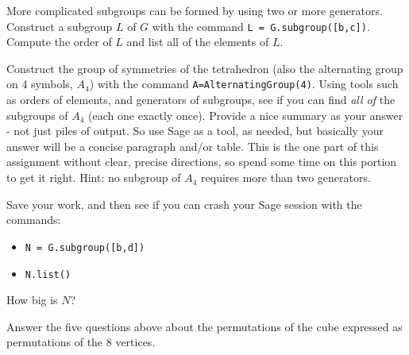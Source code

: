 \begin{sageverbatim}\end{sageverbatim}
%
More complicated subgroups can be formed by using two or more generators.  Construct a subgroup $L$ of $G$ with the command \verb?L = G.subgroup([b,c])?.  Compute the order of $L$ and list all of the elements of $L$.
\begin{sageverbatim}\end{sageverbatim}
%
Construct the group of symmetries of the tetrahedron (also the alternating group on 4 symbols, $A_4$) with the command \verb?A=AlternatingGroup(4)?.  Using tools such as orders of elements, and generators of subgroups, see if you can find \emph{all of} the subgroups of $A_4$ (each one exactly once).  Provide a nice summary as your answer - not just piles of output.  So use Sage as a tool, as needed, but basically your answer will be a concise paragraph and/or table.  This is the one part of this assignment without clear, precise directions, so spend some time on this portion to get it right.  Hint: no subgroup of $A_4$ requires more than two generators.
\begin{sageverbatim}\end{sageverbatim}
%
Save your work, and then see if you can crash your Sage session with the commands:
%
\begin{itemize}
\item\verb?N = G.subgroup([b,d])?
\item\verb?N.list()?
\end{itemize}
%
How big is $N$?
\begin{sageverbatim}\end{sageverbatim}
%
Answer the five questions above about the permutations of the cube expressed as permutations of the 8 vertices.
\begin{sageverbatim}\end{sageverbatim}
%
